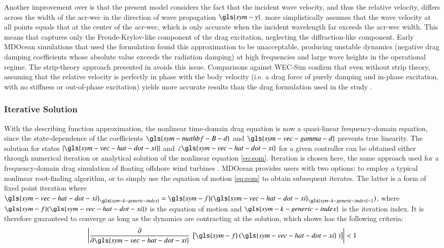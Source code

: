 Another improvement over \citet{quartier_influence_2021} is that the present model considers the fact that the incident wave velocity, and thus the relative velocity, differs across the width of the \gls{acr-wec} in the direction of wave propagation $\gls{sym-y}$.
\citet{quartier_influence_2021} more simplistically assumes that the wave velocity at all points equals that at the center of the \gls{acr-wec}, which is only accurate when the incident wavelength far exceeds the \gls{acr-wec} width.
This means that \citet{quartier_influence_2021} captures only the Froude-Krylov-like component of the drag excitation, neglecting the diffraction-like component.
Early MDOcean simulations that used the \citet{quartier_influence_2021} formulation found this approximation to be unacceptable, producing unstable dynamics (negative drag damping coefficients whose absolute value exceeds the radiation damping) at high frequencies and large wave heights in the operational regime.
The strip-theory approach presented in  avoids this issue.
Comparisons against WEC-Sim confirm that even without strip theory, assuming that the relative velocity is perfectly in phase with the body velocity (i.e. a drag force of purely damping and in-phase excitation, with no stiffness or out-of-phase excitation) yields more accurate results than the drag formulation used in the study \citep{quartier_influence_2021}.

\subsubsection{Iterative Solution}
With the describing function approximation, the nonlinear time-domain drag equation is now a quasi-linear frequency-domain equation, since the state-dependence of the coefficients $\gls{sym-mathbf-B-d}$ and $\gls{sym-vec-gamma-d}$ prevents true linearity.
The solution for states $|\gls{sym-vec-hat-dot-xi}|$ and $\angle \gls{sym-vec-hat-dot-xi}$ for a given controller can be obtained either through numerical iteration or analytical solution of the nonlinear equation \eqref{eq:eom}.
Iteration is chosen here, the same approach used for a frequency-domain drag simulation of floating offshore wind turbines \citep{hall_open-source_2022}.
MDOcean provides users with two options: to employ a typical nonlinear root-finding algorithm, or to simply use the equation of motion \eqref{eq:eom} to obtain subsequent iterates.
The latter is a form of fixed point iteration where $\gls{sym-vec-hat-dot-xi}_{\gls{sym-k-generic-index}} = \gls{sym-f}(\gls{sym-vec-hat-dot-xi}_{\gls{sym-k-generic-index}-1})$, where $\gls{sym-f}(\gls{sym-vec-hat-dot-xi})$ is the equation of motion  and $\gls{sym-k-generic-index}$ is the iteration index.
It is therefore guaranteed to converge as long as the dynamics are contracting at the solution, which \citet{chicone_contraction_2006} shows has the following criteria:
\begin{equation}
 \left|
    \frac{\partial}
    {\partial \gls{sym-vec-hat-dot-xi}}~\left[
    \gls{sym-f}\left(
        \gls{sym-vec-hat-dot-xi}~
    \right)\right]
\right| < 1
\end{equation}

